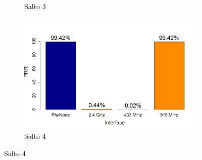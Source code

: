 \documentclass[
	12pt,				%
	openright,			%
	oneside,
	a4paper,			%
	english,			%
	french,				%
	spanish,			%
	brazil				%
	]{abntex2}
\begin{document}
\begin{figure}[b!]
\begin{subfigure}{.5\textwidth}
		\captionsetup{width=.9\textwidth}
		\caption{Salto 3}
		\label{prr_opt_s3}
	\end{subfigure}%
	\begin{subfigure}{.5\textwidth}
		\centering
		\includegraphics[width=.98\linewidth]{PRR_OPT_Salto4}
		\captionsetup{width=.9\textwidth}
		\caption{Salto 4}
		\label{prr_opt_s4}
	\end{subfigure}
\end{figure}
\end{document}
